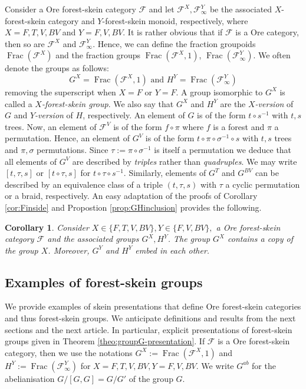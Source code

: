 \documentclass[a4paper, 12pt]{amsart}
\numberwithin{equation}{section}
\newtheorem{corollary}[theorem]{Corollary}
\theoremstyle{definition}
\newcommand{\cF}{\mathcal F}
\DeclareMathOperator{\Frac}{Frac}
\begin{document}
Consider a Ore forest-skein category $\cF$ and let $\cF^X, \cF^Y_\infty$ be the associated $X$-forest-skein category and $Y$-forest-skein monoid, respectively, where $X=F,T,V,BV$ and $Y=F,V,BV$.
It is rather obvious that if $\cF$ is a Ore category, then so are $\cF^X$ and $\cF^Y_\infty$.
Hence, we can define the fraction groupoids  $\Frac(\cF^X)$ and the fraction groups $\Frac(\cF^X,1)$, $\Frac(\cF_\infty^Y).$
We often denote the groups as follows:
$$G^X=\Frac(\cF^X,1) \text{ and } H^Y=\Frac(\cF_\infty^Y)$$
removing the superscript when $X=F$ or $Y=F$.
A group isomorphic to $G^X$ is called a {\it $X$-forest-skein group}.
We also say that $G^X$ and $H^Y$ are the {\it $X$-version} of $G$ and {\it $Y$-version} of $H$, respectively.
An element of $G$ is of the form $t\circ s^{-1}$ with $t,s$ trees.
Now, an element of $\cF^V$ is of the form $f\circ \pi$ where $f$ is a forest and $\pi$ a permutation.
Hence, an element of $G^V$ is of the form $t\circ \pi \circ \sigma^{-1}\circ s$ with $t,s$ trees and $\pi,\sigma$ permutations.
Since $\tau:=\pi\circ\sigma^{-1}$ is itself a permutation we deduce that all elements of $G^V$ are described by {\it triples} rather than {\it quadruples}.
We may write $[t,\tau,s]$ or $[t\circ \tau,s]$ for $t\circ \tau\circ s^{-1}$.
Similarly, elements of $G^T$ and $G^{BV}$ can be described by an equivalence class of a triple $(t,\tau,s)$ with $\tau$ a cyclic permutation or a braid, respectively.
An easy adaptation of the proofs of Corollary \ref{cor:Finside} and Propostion \ref{prop:GHinclusion} provides the following.

\begin{corollary}
Consider $X\in\{F,T,V,BV\}, Y\in\{F,V,BV\},$ a Ore forest-skein category $\cF$ and the associated groups $G^X,H^Y$.
The group $G^X$ contains a copy of the group $X$.
Moreover, $G^Y$ and $H^Y$ embed in each other.
\end{corollary}

\subsection{Examples of forest-skein groups}\label{sec:example}

We provide examples of skein presentations that define Ore forest-skein categories and thus forest-skein groups. 
We anticipate definitions and results from the next sections and the next article. 
In particular, explicit presentations of forest-skein groups given in Theorem \ref{theo:groupG-presentation}. %
If $\cF$ is a Ore forest-skein category, then we use the notations $G^X:=\Frac(\cF^X,1)$ and $H^Y:=\Frac(\cF_\infty^Y)$ for $X=F,T,V,BV, Y=F,V,BV$.
We write $G^{ab}$ for the abelianisation $G/[G,G]=G/G'$ of the group $G$.
\end{document}
